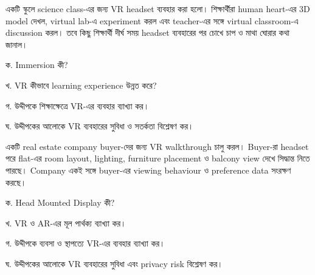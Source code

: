 \begin{topicbody}
একটি স্কুলে science class-এর জন্য VR headset ব্যবহার করা হলো। শিক্ষার্থীরা human heart-এর 3D model দেখল, virtual lab-এ experiment করল এবং teacher-এর সঙ্গে virtual classroom-এ discussion করল। তবে কিছু শিক্ষার্থী দীর্ঘ সময় headset ব্যবহারের পর চোখে চাপ ও মাথা ঘোরার কথা জানাল।

\begin{compactenum}
\item ক. Immersion কী?
\item খ. VR কীভাবে learning experience উন্নত করে?
\item গ. উদ্দীপকে শিক্ষাক্ষেত্রে VR-এর ব্যবহার ব্যাখ্যা কর।
\item ঘ. উদ্দীপকের আলোকে VR ব্যবহারের সুবিধা ও সতর্কতা বিশ্লেষণ কর।
\end{compactenum}

একটি real estate company buyer-দের জন্য VR walkthrough চালু করল। Buyer-রা headset পরে flat-এর room layout, lighting, furniture placement ও balcony view দেখে সিদ্ধান্ত নিতে পারছে। Company একই সঙ্গে buyer-এর viewing behaviour ও preference data সংরক্ষণ করছে।

\begin{compactenum}
\item ক. Head Mounted Display কী?
\item খ. VR ও AR-এর মূল পার্থক্য ব্যাখ্যা কর।
\item গ. উদ্দীপকে ব্যবসা ও স্থাপত্যে VR-এর ব্যবহার ব্যাখ্যা কর।
\item ঘ. উদ্দীপকের আলোকে VR ব্যবহারের সুবিধা এবং privacy risk বিশ্লেষণ কর।
\end{compactenum}

\end{topicbody}
